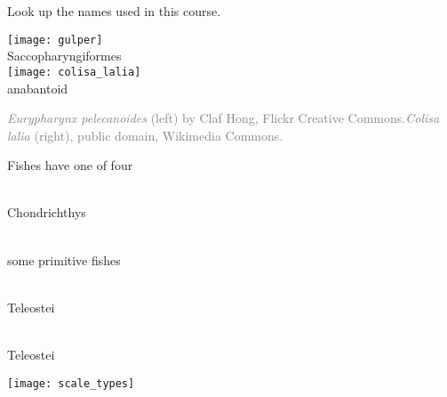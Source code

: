 \documentclass[t,handout]{beamer}  %
\begin{document}
\begin{frame}[t,plain]{Look up the names used in this course.}
\begin{multicols}{2}
	\begin{center}
		\texttt{[image: gulper]} \\
		Saccopharyngiformes\\
		\columnbreak
		\texttt{[image: colisa\_lalia]} \\
		anabantoid\\
	\end{center}
\end{multicols}
	\vfilll
	\tiny\textcolor{gray}{\textit{Eurypharynx pelecanoides} (left) by Claf Hong, Flickr Creative Commons.\hfill\textit{Colisa lalia} (right), public domain, Wikimedia Commons.}
\end{frame}


{
	\begin{frame}[b,plain]
\end{frame}
}

\begin{frame}[t,plain]{Fishes have one of four }
\begin{minipage}{0.3\textwidth}
\raggedright

\\{\small Chondrichthys}

\vspace{2em}

\\ {\small some primitive fishes}

\vspace{2em}

\\ {\small Teleostei}

\vspace{2em}

 \\{\small Teleostei}

\vspace{2em}

\end{minipage}\hfill\begin{minipage}{0.6\textwidth}

\texttt{[image: scale\_types]}
\end{minipage}
\end{frame}
\end{document}

